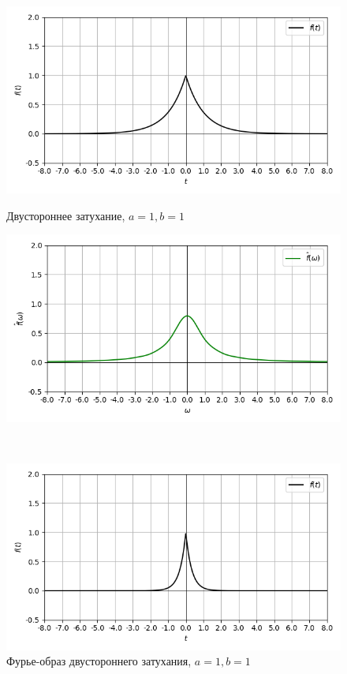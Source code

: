 \documentclass[a4paper]{article}
\begin{document}
\begin{figure}[H]
    \begin{minipage}{0.5\textwidth}
        \centering \includegraphics[width=\textwidth]{fade/real_graph_1_1.png}
        \caption{Двустороннее затухание, $a = 1, b = 1$}
    \end{minipage}\hfill
    \begin{minipage}{0.5\textwidth}
        \centering \includegraphics[width=\textwidth]{fade/real_fourier_1_1.png}
        \caption{Фурье-образ двустороннего затухания, $a = 1, b = 1$}
    \end{minipage}\\[1em]
        \begin{minipage}{0.5\textwidth}
        \centering \includegraphics[width=\textwidth]{fade/real_graph_1_3.png}

\end{minipage}
\end{figure}
\end{document}
